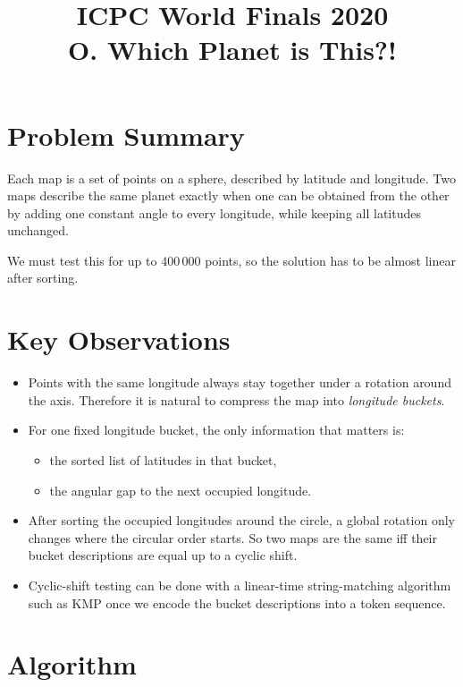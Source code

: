 \documentclass[11pt]{article}
\title{ICPC World Finals 2020\\O. Which Planet is This?!}
\author{}
\date{}
\begin{document}
\maketitle

\section*{Problem Summary}

Each map is a set of points on a sphere, described by latitude and longitude. Two maps describe the same
planet exactly when one can be obtained from the other by adding one constant angle to every longitude,
while keeping all latitudes unchanged.

We must test this for up to $400\,000$ points, so the solution has to be almost linear after sorting.

\section*{Key Observations}

\begin{itemize}[leftmargin=*]
    \item Points with the same longitude always stay together under a rotation around the axis. Therefore it is
    natural to compress the map into \emph{longitude buckets}.
    \item For one fixed longitude bucket, the only information that matters is:
    \begin{itemize}[leftmargin=*]
        \item the sorted list of latitudes in that bucket,
        \item the angular gap to the next occupied longitude.
    \end{itemize}
    \item After sorting the occupied longitudes around the circle, a global rotation only changes where the
    circular order starts. So two maps are the same iff their bucket descriptions are equal up to a cyclic
    shift.
    \item Cyclic-shift testing can be done with a linear-time string-matching algorithm such as KMP once we
    encode the bucket descriptions into a token sequence.
\end{itemize}

\section*{Algorithm}
\end{document}
